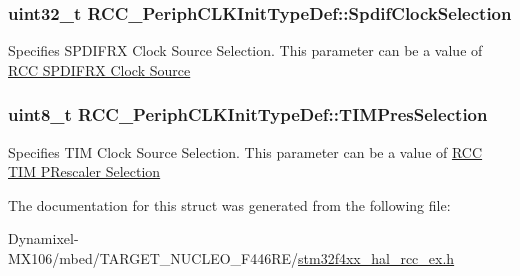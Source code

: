 \subsubsection[{\texorpdfstring{Spdif\+Clock\+Selection}{SpdifClockSelection}}]{\setlength{\rightskip}{0pt plus 5cm}uint32\+\_\+t R\+C\+C\+\_\+\+Periph\+C\+L\+K\+Init\+Type\+Def\+::\+Spdif\+Clock\+Selection}\hypertarget{struct_r_c_c___periph_c_l_k_init_type_def_a0d510e8063617a0d6cd5cdb04e247667}{}\label{struct_r_c_c___periph_c_l_k_init_type_def_a0d510e8063617a0d6cd5cdb04e247667}
Specifies S\+P\+D\+I\+F\+RX Clock Source Selection. This parameter can be a value of \hyperlink{group___r_c_c_ex___s_p_d_i_f_r_x___clock___source}{R\+CC S\+P\+D\+I\+F\+RX Clock Source} 
\subsubsection[{\texorpdfstring{T\+I\+M\+Pres\+Selection}{TIMPresSelection}}]{\setlength{\rightskip}{0pt plus 5cm}uint8\+\_\+t R\+C\+C\+\_\+\+Periph\+C\+L\+K\+Init\+Type\+Def\+::\+T\+I\+M\+Pres\+Selection}\hypertarget{struct_r_c_c___periph_c_l_k_init_type_def_a6bfa5cc9c6a8a034b552f02682dec8d4}{}\label{struct_r_c_c___periph_c_l_k_init_type_def_a6bfa5cc9c6a8a034b552f02682dec8d4}
Specifies T\+IM Clock Source Selection. This parameter can be a value of \hyperlink{group___r_c_c_ex___t_i_m___p_rescaler___selection}{R\+CC T\+IM P\+Rescaler Selection} 

The documentation for this struct was generated from the following file\+:\begin{DoxyCompactItemize}
\item 
Dynamixel-\/\+M\+X106/mbed/\+T\+A\+R\+G\+E\+T\+\_\+\+N\+U\+C\+L\+E\+O\+\_\+\+F446\+R\+E/\hyperlink{stm32f4xx__hal__rcc__ex_8h}{stm32f4xx\+\_\+hal\+\_\+rcc\+\_\+ex.\+h}\end{DoxyCompactItemize}
